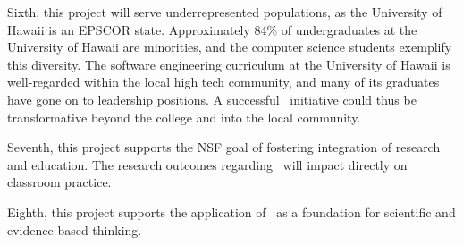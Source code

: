 Sixth, this project will serve underrepresented populations, as the
University of Hawaii is an EPSCOR state. Approximately 84\% of
undergraduates at the University of Hawaii are minorities, and the computer
science students exemplify this diversity.  The software engineering
curriculum at the University of Hawaii is well-regarded within the local
high tech community, and many of its graduates have gone on to leadership
positions. A successful \eCT\ initiative could thus be transformative
beyond the college and into the local community.

Seventh, this project supports the NSF goal of fostering integration of
research and education.  The research outcomes regarding \eCT\ will impact
directly on classroom practice.

Eighth, this project supports the application of \eCT\ as a foundation for
scientific and evidence-based thinking.








 










